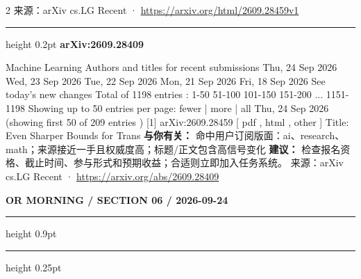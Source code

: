 \documentclass[10.5pt]{ctexart}
\begin{document}
\begin{multicols}{2}
{\footnotesize\color{ormuted} 来源：arXiv cs.LG Recent · \url{https://arxiv.org/html/2609.28459v1}}
\vspace{2mm}
\hrule height 0.2pt
\vspace{2mm}
{\large\bfseries arXiv:2609.28409}\par
Machine Learning Authors and titles for recent submissions Thu, 24 Sep 2026 Wed, 23 Sep 2026 Tue, 22 Sep 2026 Mon, 21 Sep 2026 Fri, 18 Sep 2026 See today's new changes Total of 1198 entries : 1-50 51-100 101-150 151-200 ... 1151-1198 Showing up to 50 entries per page: fewer | more | all Thu, 24 Sep 2026 (showing first 50 of 209 entries ) [1] arXiv:2609.28459 [ pdf , html , other ] Title: Even Sharper Bounds for Trans
\textbf{与你有关：} 命中用户订阅版面：ai、research、math；来源接近一手且权威度高；标题/正文包含高信号变化
\textbf{建议：} 检查报名资格、截止时间、参与形式和预期收益；合适则立即加入任务系统。
{\footnotesize\color{ormuted} 来源：arXiv cs.LG Recent · \url{https://arxiv.org/abs/2609.28409}}
\end{multicols}
\newpage
{\small\bfseries OR MORNING / SECTION 06 / 2026-09-24}
\vspace{2mm}
\hrule height 0.9pt
\vspace{1.5mm}
\hrule height 0.25pt
\vspace{4mm}
\end{document}
